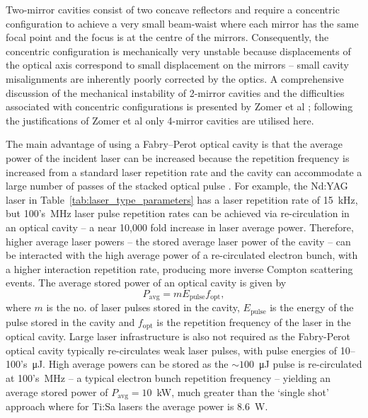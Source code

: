\documentclass[../main.tex]{subfiles}
\begin{document}
Two-mirror cavities consist of
two concave reflectors and require a concentric configuration to achieve a very small beam-waist where each mirror has the same focal point and the focus is at the centre of the mirrors. Consequently, the concentric configuration is mechanically very unstable \cite{dupraz2015abcd} because displacements of the optical axis
correspond to small displacement on the mirrors \cite{variola2011luminosity} -- small cavity misalignments are inherently poorly corrected by the optics. A comprehensive discussion of the mechanical instability of 2-mirror cavities and the difficulties associated with concentric configurations is presented by Zomer et al \cite{zomer2009polarization}; following the justifications of Zomer et al only 4-mirror cavities are utilised here. 

The main advantage of using a Fabry--Perot optical cavity is that the average power of the incident laser can be increased because the repetition frequency is increased from a standard laser repetition rate and the cavity can accommodate a large number of passes of the stacked optical pulse \cite{variola2011luminosity}. For example, the Nd:YAG laser in Table~\ref{tab:laser_type_parameters} has a laser repetition rate of 15~\si{\kilo\hertz}, but 100's~\si{\mega\hertz} laser pulse repetition rates can be achieved via re-circulation in an optical cavity -- a near 10,000 fold increase in laser average power. Therefore, higher average laser powers -- the stored average laser power of the cavity -- can be interacted with the high average power of a re-circulated electron bunch, with a higher interaction repetition rate, producing more inverse Compton scattering events. The average stored power of an optical cavity is given by
\begin{equation}
P_{\mathrm{avg}} = mE_{\mathrm{pulse}}f_{\mathrm{opt}},
\label{eq:average_stored_power_cavity}    
\end{equation}
where $m$ is the no. of laser pulses stored in the cavity, $E_{\mathrm{pulse}}$ is the energy of the pulse stored in the cavity and $f_{\mathrm{opt}}$ is the repetition frequency of the laser in the optical cavity. Large laser infrastructure is also not required as the Fabry-Perot optical cavity typically re-circulates weak laser pulses, with pulse energies of 10--100's~\si{\micro\joule}. High average powers can be stored as the $\sim100$~\si{\micro\joule} pulse is re-circulated at 100's~\si{\mega\hertz} -- a typical electron bunch repetition frequency -- yielding an average stored power of $P_{\mathrm{avg}}= 10$~\si{\kilo\watt}, much greater than the `single shot' approach where for Ti:Sa lasers the average power is 8.6~\si{\watt}.
\end{document}
